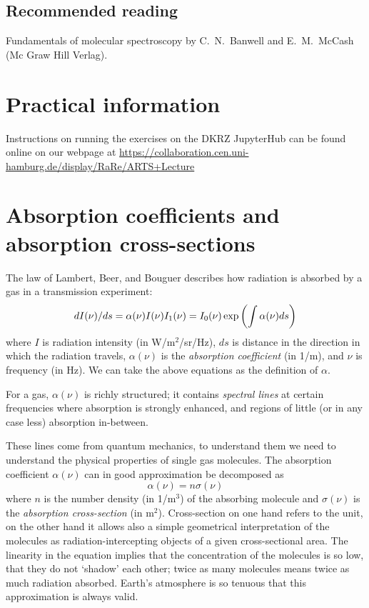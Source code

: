 \subsection*{Recommended reading}

Fundamentals of molecular spectroscopy by C.\ N.\
Banwell and E.\ M.\ McCash (Mc Graw Hill Verlag).


\section{Practical information}

Instructions on running the exercises on the DKRZ JupyterHub can be
found online on our webpage at
\url{https://collaboration.cen.uni-hamburg.de/display/RaRe/ARTS+Lecture}

\section{Absorption coefficients and absorption cross-sections}
\label{sec:absorption}

The law of Lambert, Beer, and Bouguer describes how radiation is
absorbed by a gas in a transmission experiment:
\begin{equation}
  dI(\nu)/ds = \alpha(\nu) I(\nu)\\
  I_1(\nu) = I_0(\nu) \exp \left( \int \alpha(\nu)ds \right)
\end{equation}
where $I$ is radiation intensity (in W/m$^2$/sr/Hz), $ds$ is distance in
the direction in which the radiation travels, $\alpha(\nu)$ is the
\emph{absorption coefficient} (in 1/m), and $\nu$ is frequency (in
Hz). We can take the above equations as the definition of $\alpha$.

For a gas, $\alpha(\nu)$ is richly structured; it contains
\emph{spectral lines} at certain frequencies where absorption is
strongly enhanced, and regions of little (or in any case less)
absorption in-between.

These lines come from quantum mechanics, to understand them we need to
understand the physical properties of single gas molecules. The
absorption coefficient $\alpha(\nu)$ can in good approximation be
decomposed as
\begin{equation}
  \alpha(\nu) = n \sigma(\nu)
\end{equation}
where $n$ is the number density (in 1/m$^3$) of the absorbing molecule
and $\sigma(\nu)$ is the \emph{absorption cross-section} (in
m$^2$). Cross-section on one hand refers to the unit, on the other
hand it allows also a simple geometrical interpretation of the
molecules as radiation-intercepting objects of a given cross-sectional
area. The linearity in the equation implies that the concentration of
the molecules is so low, that they do not `shadow' each other; twice
as many molecules means twice as much radiation absorbed. Earth's
atmosphere is so tenuous that this approximation is always valid. 


